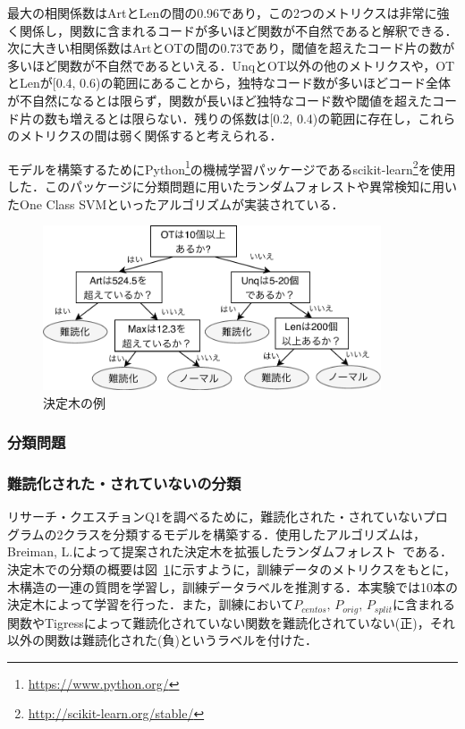 \documentclass[12pt]{jarticle}
\begin{document}
最大の相関係数はArtとLenの間の0.96であり，この2つのメトリクスは非常に強く関係し，関数に含まれるコードが多いほど関数が不自然であると解釈できる．次に大きい相関係数はArtとOTの間の0.73であり，閾値を超えたコード片の数が多いほど関数が不自然であるといえる．UnqとOT以外の他のメトリクスや，OTとLenが[0.4, 0.6)の範囲にあることから，独特なコード数が多いほどコード全体が不自然になるとは限らず，関数が長いほど独特なコード数や閾値を超えたコード片の数も増えるとは限らない．残りの係数は[0.2, 0.4)の範囲に存在し，これらのメトリクスの間は弱く関係すると考えられる．

モデルを構築するためにPython\footnote{\url{https://www.python.org/}}の機械学習パッケージであるscikit-learn\footnote{\url{http://scikit-learn.org/stable/}}を使用した．このパッケージに分類問題に用いたランダムフォレストや異常検知に用いたOne Class SVMといったアルゴリズムが実装されている．

\begin{figure}[!b]
 \centering
 \includegraphics[width=10cm]{DT.pdf}
 \caption{決定木の例}
 \label{fig:DT}
\end{figure}

\subsubsection{分類問題}
\subsubsection*{難読化された・されていないの分類}
リサーチ・クエスチョンQ1を調べるために，難読化された・されていないプログラムの2クラスを分類するモデルを構築する．使用したアルゴリズムは，Breiman, L.によって提案された決定木を拡張したランダムフォレスト~\cite{RF}である．決定木での分類の概要は図~\ref{fig:DT}に示すように，訓練データのメトリクスをもとに，木構造の一連の質問を学習し，訓練データラベルを推測する．本実験では10本の決定木によって学習を行った．また，訓練において$P_{centos},\,P_{orig},\,P_{split}$に含まれる関数やTigressによって難読化されていない関数を難読化されていない(正)，それ以外の関数は難読化された(負)というラベルを付けた．
\end{document}
